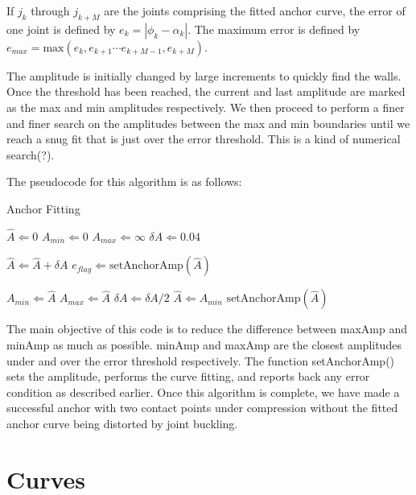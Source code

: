 If $j_k$ through $j_{k+M}$ are the joints comprising the fitted anchor curve, the error of one joint is defined by $e_k = |\phi_k-\alpha_k|$. The maximum error is defined by $e_{max} = \mathrm{max}(e_k, e_{k+1} \cdots e_{k+M-1}, e_{k+M})$.

The amplitude is initially changed by large increments to quickly find the walls. Once the threshold has been reached, the current and last amplitude are marked as the max and min amplitudes respectively. We then proceed to perform a finer and finer search on the amplitudes between the max and min boundaries until we reach a snug fit that is just over the error threshold. This is a kind of numerical search(?).

The pseudocode for this algorithm is as follows:


\begin{algorithm}
\caption{Anchor Fitting}          %
\label{alg:anchor}
\begin{algorithmic}

\State $\hat{A} \Leftarrow 0$
\State $A_{min} \Leftarrow 0$
\State $A_{max} \Leftarrow \infty$
\State $\delta A \Leftarrow 0.04$


  \State $\hat{A} \Leftarrow \hat{A} + \delta A$
  \State $e_{flag} \Leftarrow \mathrm{setAnchorAmp}(\hat{A})$
 
    \State $A_{min} \Leftarrow \hat{A}$
  \Else
    \State $A_{max} \Leftarrow \hat{A}$
    \State $\delta A \Leftarrow \delta A / 2$
    \State $\hat{A} \Leftarrow A_{min}$
    \State $\mathrm{setAnchorAmp}(\hat{A})$

  \EndIf

\EndWhile

\end{algorithmic}
\end{algorithm}


The main objective of this code is to reduce the difference between maxAmp and minAmp as much as possible. minAmp and maxAmp are the closest amplitudes under and over the error threshold respectively. The function setAnchorAmp() sets the amplitude, performs the curve fitting, and reports back any error condition as described earlier. Once this algorithm is complete, we have made a successful anchor with two contact points under compression without the fitted anchor curve being distorted by joint buckling.

\section{Curves}
\label{curves}

